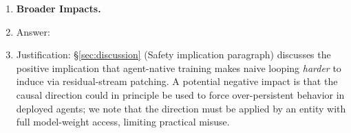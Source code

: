 \documentclass{article}
\begin{document}
\begin{enumerate}
\item \textbf{Broader Impacts.}
\item[] Answer: \answerYes{}
\item[] Justification: \S\ref{sec:discussion} (Safety implication
paragraph) discusses the positive implication that agent-native
training makes naive looping \emph{harder} to induce via residual-stream
patching.  A potential negative impact is that the causal direction
could in principle be used to force over-persistent behavior in deployed
agents; we note that the direction must be applied by an entity with
full model-weight access, limiting practical misuse.

\end{enumerate}
\end{document}
